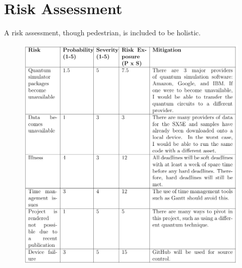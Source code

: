 \documentclass[12pt]{article}
\numberwithin{equation}{section}
\begin{document}
\clearpage
\section{Risk Assessment}
A risk assessment, though pedestrian, is included to be holistic.\\


\begin{figure}[h]
    \centering
    \includegraphics[scale=1]{RiskAssess.png}
\end{figure}

\clearpage

\printbibliography
\end{document}

